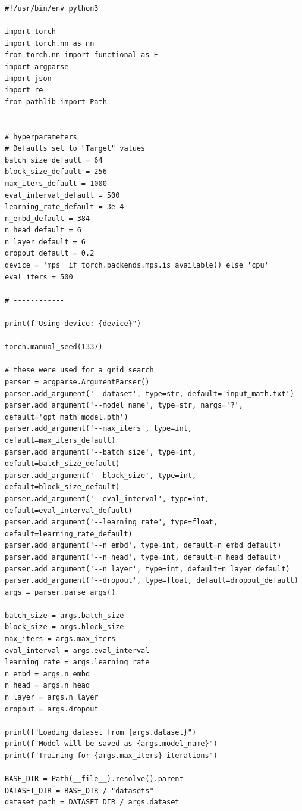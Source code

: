 % 

\begin{verbatim}
#!/usr/bin/env python3

import torch
import torch.nn as nn
from torch.nn import functional as F
import argparse
import json
import re
from pathlib import Path


# hyperparameters
# Defaults set to "Target" values
batch_size_default = 64
block_size_default = 256
max_iters_default = 1000
eval_interval_default = 500
learning_rate_default = 3e-4
n_embd_default = 384
n_head_default = 6
n_layer_default = 6
dropout_default = 0.2
device = 'mps' if torch.backends.mps.is_available() else 'cpu'
eval_iters = 500

# ------------

print(f"Using device: {device}")

torch.manual_seed(1337)

# these were used for a grid search
parser = argparse.ArgumentParser()
parser.add_argument('--dataset', type=str, default='input_math.txt')
parser.add_argument('--model_name', type=str, nargs='?', default='gpt_math_model.pth')
parser.add_argument('--max_iters', type=int, default=max_iters_default)
parser.add_argument('--batch_size', type=int, default=batch_size_default)
parser.add_argument('--block_size', type=int, default=block_size_default)
parser.add_argument('--eval_interval', type=int, default=eval_interval_default)
parser.add_argument('--learning_rate', type=float, default=learning_rate_default)
parser.add_argument('--n_embd', type=int, default=n_embd_default)
parser.add_argument('--n_head', type=int, default=n_head_default)
parser.add_argument('--n_layer', type=int, default=n_layer_default)
parser.add_argument('--dropout', type=float, default=dropout_default)
args = parser.parse_args()

batch_size = args.batch_size
block_size = args.block_size
max_iters = args.max_iters
eval_interval = args.eval_interval
learning_rate = args.learning_rate
n_embd = args.n_embd
n_head = args.n_head
n_layer = args.n_layer
dropout = args.dropout

print(f"Loading dataset from {args.dataset}")
print(f"Model will be saved as {args.model_name}")
print(f"Training for {args.max_iters} iterations")

BASE_DIR = Path(__file__).resolve().parent
DATASET_DIR = BASE_DIR / "datasets"
dataset_path = DATASET_DIR / args.dataset


\end{verbatim}

